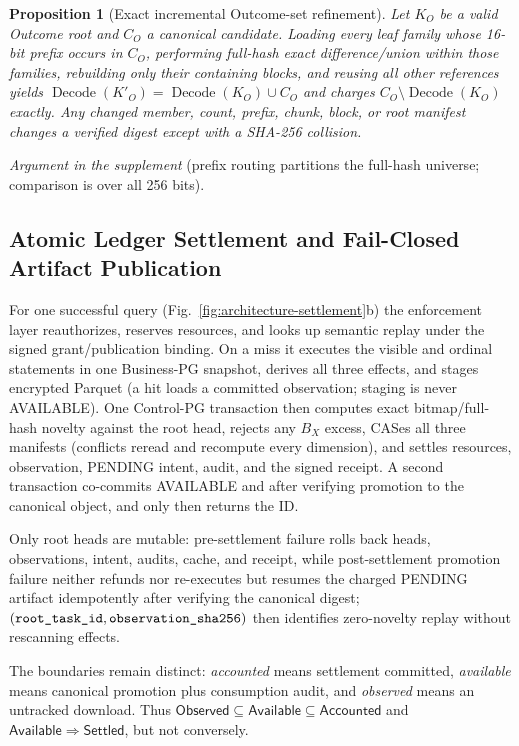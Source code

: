 \documentclass[10pt,journal,compsoc]{IEEEtran}
\newcommand{\code}[1]{\texttt{\detokenize{#1}}}
\newtheorem{proposition}{Proposition}
\begin{document}
\begin{proposition}[Exact incremental Outcome-set refinement]
\label{thm:outcome-radix-refinement}
Let $K_O$ be a valid Outcome root and $C_O$ a canonical candidate. Loading every
leaf family whose 16-bit prefix occurs in $C_O$, performing full-hash exact
difference/union within those families, rebuilding only their containing
blocks, and reusing all other references yields
$\operatorname{Decode}(K'_O)=\operatorname{Decode}(K_O)\cup C_O$ and charges
$C_O\setminus\operatorname{Decode}(K_O)$ exactly. Any changed member, count,
prefix, chunk, block, or root manifest changes a verified digest except with a
SHA-256 collision.
\end{proposition}
\emph{Argument in the supplement} (prefix routing partitions the full-hash
universe; comparison is over all 256 bits).

\subsection{Atomic Ledger Settlement and Fail-Closed Artifact Publication}

For one successful query (Fig.~\ref{fig:architecture-settlement}b) the
enforcement layer reauthorizes, reserves resources, and looks up semantic
replay under the signed grant/publication binding. On a miss it executes
the visible and ordinal statements in one Business-PG snapshot, derives all
three effects, and stages encrypted Parquet (a hit loads a committed
observation; staging is never AVAILABLE). One Control-PG transaction then
computes exact bitmap/full-hash novelty against the root head, rejects any
$B_X$ excess, CASes all three manifests (conflicts reread and recompute
every dimension), and settles resources, observation, PENDING intent,
audit, and the signed receipt. A second transaction co-commits AVAILABLE
and \code{QUERY_RESULT_CONSUMED} after verifying promotion to the
canonical object, and only then returns the ID.

Only root heads are mutable: pre-settlement failure rolls back heads,
observations, intent, audits, cache, and receipt, while post-settlement
promotion failure neither refunds nor re-executes but resumes the charged
PENDING artifact idempotently after verifying the canonical digest;
$(\code{root_task_id},\code{observation_sha256})$ then identifies
zero-novelty replay without rescanning effects.

The boundaries remain distinct: \emph{accounted} means settlement committed,
\emph{available} means canonical promotion plus consumption audit, and
\emph{observed} means an untracked download. Thus
$\mathsf{Observed}\subseteq\mathsf{Available}\subseteq\mathsf{Accounted}$ and
$\mathsf{Available}\Rightarrow\mathsf{Settled}$, but not conversely.
\end{document}
